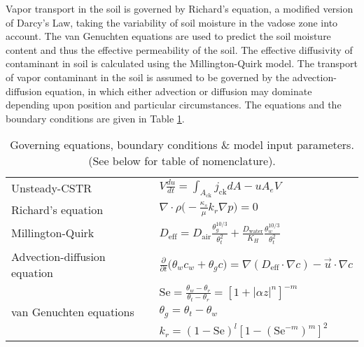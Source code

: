 \documentclass[journal=esthag,manuscript=article]{achemso}
\begin{document}
Vapor transport in the soil is governed by Richard’s equation, a modified version  of Darcy’s Law, taking the variability of soil moisture in the vadose zone into account\cite{richards_capillary_1931}.
The van Genuchten equations are used to predict the soil moisture content and thus the effective permeability of the soil\cite{van_genuchten_closed-form_1980}.
The effective diffusivity of contaminant in soil is calculated using the Millington-Quirk model\cite{millington_permeability_1961}.
The transport of vapor contaminant in the soil is assumed to be governed by the advection-diffusion equation, in which either advection or diffusion may dominate depending upon position and particular circumstances.
The equations and the boundary conditions are given in Table \ref{tbl:eqns-bc-parameters}.

\begin{table}[htb!]
  \centering
  \caption{Governing equations, boundary conditions \& model input parameters. (See below for table of nomenclature).}
  \label{tbl:eqns-bc-parameters}
  \bigskip
  \begin{tabular}{l l}
    \toprule
    Unsteady-CSTR                 & $V\frac{d u}{d t} = \int_{A_\mathrm{ck}} j_\mathrm{ck} dA - u A_e V$ \\
    Richard's equation            & $\nabla \cdot \rho \Big( - \frac{\kappa_s}{\mu} k_r \nabla p \Big) = 0$ \\
    Millington-Quirk              & $D_\mathrm{eff} = D_\mathrm{air}\frac{\theta_g^{10/3}}{\theta_t^2} + \frac{D_\mathrm{water}}{K_H} \frac{\theta_w^{10/3}}{\theta_t^2}$ \\
    Advection-diffusion equation  & $\frac{\partial}{\partial t} \Big( \theta_w c_w + \theta_g c \Big) = \nabla (D_\mathrm{eff} \cdot \nabla c) - \vec{u} \cdot \nabla c$ \\
    \multirow{3}{*}{van Genuchten equations}     & $\mathrm{Se} = \frac{\theta_w - \theta_r}{\theta_t - \theta_r} = [1 + |\alpha z|^n]^{-m}$ \\
                                  & $\theta_g = \theta_t - \theta_w$ \\
                                  & $k_r = (1 - \mathrm{Se})^{l} [1 - (\mathrm{Se}^{-m})^m]^2$ \\

\end{tabular}
\end{table}
\end{document}
